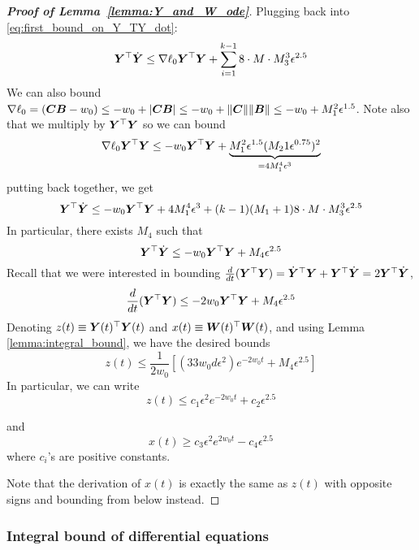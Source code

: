 \begin{proof}[\textbf{Proof of Lemma~\ref{lemma:Y_and_W_ode}}]
Plugging back into \eqref{eq:first_bound_on_Y_TY_dot}:
\begin{equation}
{\bm{Y}}^\top\dot{{\bm{Y}}} \le \nabla\ell_0 {\bm{Y}}^\top {\bm{Y}} +\sum_{i=1}^{k-1} 8\cdot M \cdot  M_3^3\epsilon^{2.5}
\end{equation}
We can also bound $\nabla\ell_0=({\bm{C}}{\bm{B}}-w_0)\le -w_0 +|{\bm{C}}{\bm{B}}|\le -w_0+\|{\bm{C}}\|\|{\bm{B}}\|\le -w_0+M_1^2\epsilon^{1.5}$. Note also that we multiply by ${\bm{Y}}^\top {\bm{Y}}$ so we can bound
\begin{equation}
    \nabla\ell_0{\bm{Y}}^\top {\bm{Y}}\le -w_0 {\bm{Y}}^\top {\bm{Y}} + \underbrace{M_1^2\epsilon^{1.5}(M_21\epsilon^{0.75})^2}_{=4M_1^4\epsilon^3}
\end{equation}
putting back together, we get
\begin{equation}
{\bm{Y}}^\top\dot{{\bm{Y}}} \le -w_0 {\bm{Y}}^\top {\bm{Y}} + 4M_1^4\epsilon^3 + (k-1)(M_1+1)8\cdot M \cdot  M_3^3\epsilon^{2.5}
\end{equation}
In particular, there exists $M_4$ such that 
\begin{equation}
{\bm{Y}}^\top\dot{{\bm{Y}}} \le -w_0 {\bm{Y}}^\top {\bm{Y}} + M_4\epsilon^{2.5}
\end{equation}
Recall that we were interested in bounding $\frac{d}{dt}({\bm{Y}}^\top {\bm{Y}})=\dot{{\bm{Y}}}^\top {\bm{Y}} + {\bm{Y}}^\top \dot{{\bm{Y}}}=2{\bm{Y}}^\top\dot{{\bm{Y}}}$,
\begin{equation}
    \frac{d}{dt}({\bm{Y}}^\top {\bm{Y}})\le -2w_0{\bm{Y}}^\top {\bm{Y}}+M_4\epsilon^{2.5}
\end{equation}
Denoting $z(t)\equiv {\bm{Y}}(t)^\top {\bm{Y}}(t)$ and $x(t)\equiv {\bm{W}}(t)^\top {\bm{W}}(t)$, and using Lemma \ref{lemma:integral_bound}, we have the desired bounds
\begin{equation}
    z(t)  \le \frac{1}{2w_0}\left[(33w_0 d \epsilon^2)e^{-2w_0 t} + M_4 \epsilon^{2.5} \right]
\end{equation}
In particular, we can write
\begin{equation}
    z(t)  \le c_1\epsilon^2e^{-2w_0 t} + c_2 \epsilon^{2.5}
\end{equation}

and
\begin{equation}
    x(t)  \ge c_3\epsilon^2e^{2w_0 t} - c_4 \epsilon^{2.5}
\end{equation}
where $c_i$'s are positive constants.

Note that the derivation of $x(t)$ is exactly the same as $z(t)$ with opposite signs and bounding from below instead.

\end{proof}

\subsubsection{Integral bound of differential equations}


